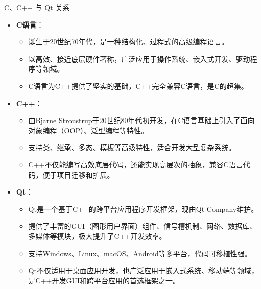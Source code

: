 \documentclass[UTF8,aspectratio=169]{beamer}
\begin{document}
\begin{frame}{C、C++ 与 Qt 关系}
        \begin{itemize}
            \item \textbf{C语言}：
            \begin{itemize}
                \item 诞生于20世纪70年代，是一种结构化、过程式的高级编程语言。
                \item 以高效、接近底层硬件著称，广泛应用于操作系统、嵌入式开发、驱动程序等领域。
                \item C语言为C++提供了坚实的基础，C++完全兼容C语言，是C的超集。
            \end{itemize}
            \item \textbf{C++}：
            \begin{itemize}
                \item 由Bjarne Stroustrup于20世纪80年代初开发，在C语言基础上引入了面向对象编程（OOP）、泛型编程等特性。
                \item 支持类、继承、多态、模板等高级特性，适合开发大型复杂系统。
                \item C++不仅能编写高效底层代码，还能实现高层次的抽象，兼容C语言代码，便于项目迁移和扩展。
            \end{itemize}
            \item \textbf{Qt}：
            \begin{itemize}
                \item Qt是一个基于C++的跨平台应用程序开发框架，现由Qt Company维护。
                \item 提供了丰富的GUI（图形用户界面）组件、信号槽机制、网络、数据库、多媒体等模块，极大提升了C++开发效率。
                \item 支持Windows、Linux、macOS、Android等多平台，代码可移植性强。
                \item Qt不仅适用于桌面应用开发，也广泛应用于嵌入式系统、移动端等领域，是C++开发GUI和跨平台应用的首选框架之一。
            \end{itemize}
        \end{itemize}
\end{frame}
\end{document}
